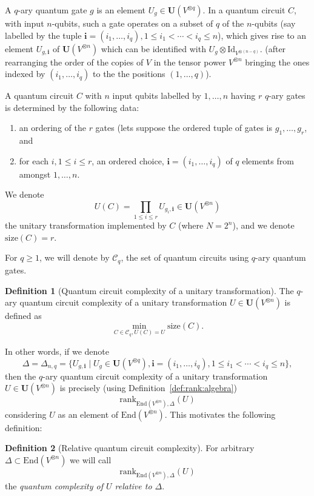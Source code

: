 \documentclass[10pt]{amsart}
\theoremstyle{definition}
\newtheorem{definition}{Definition}[section]
\theoremstyle{remark}
\numberwithin{equation}{section}
\newcommand{\rank}{\mathrm{rank}}
\newcommand{\size}{\mathrm{size}}
\newcommand{\End}{\mathrm{End}}
\begin{document}
A $q$-ary quantum gate $g$ is an element $U_g \in \mathbf{U}(V^{\otimes q})$. 
In a quantum circuit $C$,  with input $n$-qubits, such a gate operates on a subset of $q$ of
the $n$-qubits (say labelled by the tuple $\mathbf{i} = (i_1,\ldots,i_q), 1 \leq i_1 <\cdots <i_q \leq n $),
which gives rise to an element $U_{g,\mathbf{i}}$ of  $\mathbf{U}(V^{\otimes n})$ which can be identified with  
$U_g \otimes \mathrm{Id}_{V^{\otimes (n-q)}}$.
(after rearranging the order of the copies of $V$ in the tensor power $V^{\otimes n}$
bringing the ones indexed by $(i_1,\ldots,i_q)$ to the the positions $(1,\ldots,q)$).

A quantum circuit $C$ with $n$ input qubits labelled by $1,\ldots,n$ having $r$  
$q$-ary gates is determined by the following data:
\begin{enumerate}[1.]
    \item an ordering of the $r$ gates 
(lets suppose the ordered tuple of gates is $g_1,\ldots,g_r$,  and
\item 
for each $i, 1 \leq i \leq r$,  an ordered  choice, $\mathbf{i} = (i_1,\ldots,i_q)$ of $q$ elements
from amongst $1,\ldots,n$.
\end{enumerate}
We denote 
\[
U(C) = \prod_{1 \leq i \leq r} U_{g_i,\mathbf{i}} \in \mathbf{U}(V^{ \otimes n})
\]
the unitary transformation implemented by $C$ (where $N = 2^{n}$), and we denote $\size(C) = r$.

For $q \geq 1$, 
we will denote by $\mathcal{C}_q$, the set of quantum circuits 
using $q$-ary quantum gates.



\begin{definition}[Quantum circuit complexity of a unitary transformation]
\label{def:quantum-complexity}
    The $q$-ary quantum circuit complexity of a unitary transformation $U \in \mathbf{U}(V^{\otimes n})$ is defined 
    as 
    \[
        \min_{C \in \mathcal{C}_q, U(C) = U} \size(C).
    \]
\end{definition}
In other words, if we denote  
\[
\Delta = \Delta_{n,q} = \{ U_{g,\mathbf{i}} \mid U_g \in \mathbf{U}(V^{\otimes q}), 
\mathbf{i} = (i_1,\ldots,i_q), 1 \leq i_1 < \cdots < i_q \leq n\},
\]
then the $q$-ary quantum circuit complexity  of a unitary transformation $U \in \mathbf{U}(V^{\otimes n})$ 
is precisely (using Definition~\ref{def:rank:algebra})
\[
\rank_{\End(V^{\otimes n}),\Delta}(U)
\]
considering $U$ as an element of $\End(V^{\otimes n})$.
This motivates the following definition:
\begin{definition}[Relative quantum circuit complexity]
 \label{def:quantum-complexity-relative} 
For arbitrary $\Delta \subset \End(V^{\otimes n})$ we will call 
\[
\rank_{\End(V^{\otimes n}),\Delta}(U)
\]
the \emph{quantum complexity of $U$ relative to $\Delta$}.
\end{definition}
\end{document}
